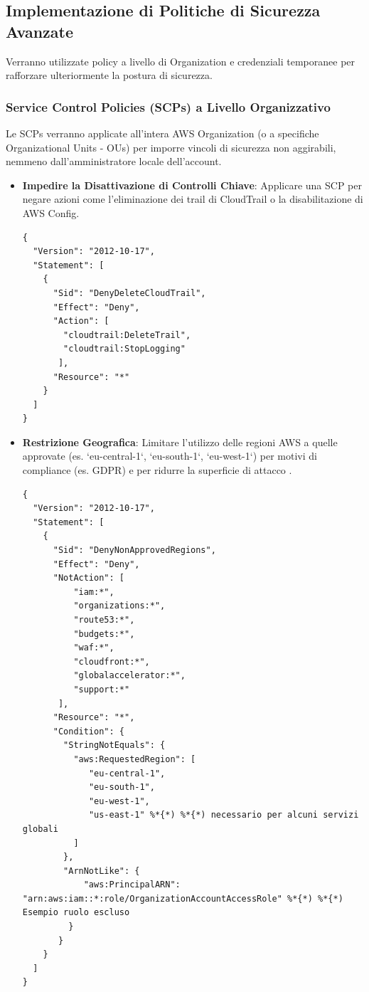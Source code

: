 \documentclass[a4paper,12pt]{report}
\begin{document}
\subsection{Implementazione di Politiche di Sicurezza Avanzate}

Verranno utilizzate policy a livello di Organization e credenziali temporanee per rafforzare ulteriormente la postura di sicurezza.

\subsubsection{Service Control Policies (SCPs) a Livello Organizzativo}

Le SCPs verranno applicate all'intera AWS Organization (o a specifiche Organizational Units - OUs) per imporre vincoli di sicurezza non aggirabili, nemmeno dall'amministratore locale dell'account.
\begin{itemize}
    \item \textbf{Impedire la Disattivazione di Controlli Chiave}: Applicare una SCP per negare azioni come l'eliminazione dei trail di CloudTrail o la disabilitazione di AWS Config.
    \begin{lstlisting}[style=json, caption={SCP per prevenire l'eliminazione di CloudTrail}, label=lst:scp-deny-cloudtrail-delete]
{
  "Version": "2012-10-17",
  "Statement": [
    {
      "Sid": "DenyDeleteCloudTrail",
      "Effect": "Deny",
      "Action": [
        "cloudtrail:DeleteTrail",
        "cloudtrail:StopLogging"
       ],
      "Resource": "*"
    }
  ]
}
    \end{lstlisting}
    \item \textbf{Restrizione Geografica}: Limitare l'utilizzo delle regioni AWS a quelle approvate (es. `eu-central-1`, `eu-south-1`, `eu-west-1`) per motivi di compliance (es. GDPR) e per ridurre la superficie di attacco \cite{awsbuilders:scps}.
    \begin{lstlisting}[style=json, caption={SCP per limitare le regioni utilizzabili}, label=lst:scp-region-restriction]
{
  "Version": "2012-10-17",
  "Statement": [
    {
      "Sid": "DenyNonApprovedRegions",
      "Effect": "Deny",
      "NotAction": [
          "iam:*",
          "organizations:*",
          "route53:*",
          "budgets:*",
          "waf:*",
          "cloudfront:*",
          "globalaccelerator:*",
          "support:*"
       ],
      "Resource": "*",
      "Condition": {
        "StringNotEquals": {
          "aws:RequestedRegion": [
             "eu-central-1",
             "eu-south-1",
             "eu-west-1",
             "us-east-1" %*{*) %*{*) necessario per alcuni servizi globali
          ]
        },
        "ArnNotLike": {
            "aws:PrincipalARN": "arn:aws:iam::*:role/OrganizationAccountAccessRole" %*{*) %*{*) Esempio ruolo escluso
         }
       }
    }
  ]
}
    \end{lstlisting}
\end{itemize}
\end{document}
